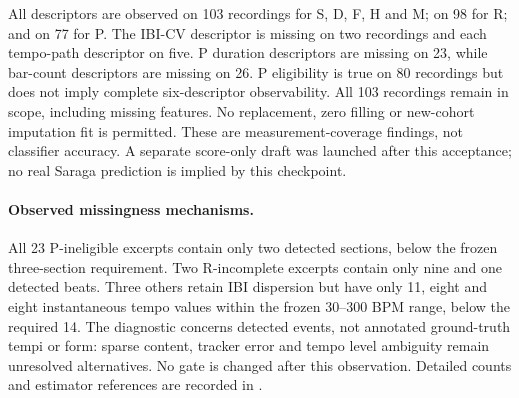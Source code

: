 All descriptors are observed on 103 recordings for S, D, F, H and M; on 98 for
R; and on 77 for P. The IBI-CV descriptor is missing on two recordings and each
tempo-path descriptor on five. P duration descriptors are missing on 23, while
bar-count descriptors are missing on 26. P eligibility is true on 80 recordings
but does not imply complete six-descriptor observability. All 103 recordings
remain in scope, including missing features. No replacement, zero filling or
new-cohort imputation fit is permitted. These are measurement-coverage findings,
not classifier accuracy. A separate score-only draft was launched after this
acceptance; no real Saraga prediction is implied by this checkpoint.

\paragraph{Observed missingness mechanisms.}
All 23 P-ineligible excerpts contain only two detected sections, below the
frozen three-section requirement. Two R-incomplete excerpts contain only nine
and one detected beats. Three others retain IBI dispersion but have only
11, eight and eight instantaneous tempo values within the frozen 30--300 BPM
range, below the required 14. The diagnostic concerns detected events, not
annotated ground-truth tempi or form: sparse content, tracker error and tempo
level ambiguity remain unresolved alternatives. No gate is changed after
this observation. Detailed counts and estimator references are recorded in
.
